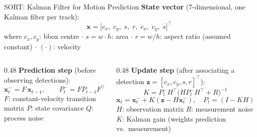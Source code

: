 \begin{frame}{SORT: Kalman Filter for Motion Prediction}
  \textbf{State vector} (7-dimensional, one Kalman filter per track):
  \[
    \mathbf{x} = \bigl[c_x,\; c_y,\; s,\; r,\; \dot{c}_x,\; \dot{c}_y,\; \dot{s}\bigr]^\top
  \]
  where $c_x, c_y$: bbox centre $\cdot$ $s = w \cdot h$: area $\cdot$
  $r = w/h$: aspect ratio (assumed constant) $\cdot$ $\dot{(\cdot)}$: velocity

  \begin{columns}[T]
    \begin{column}{0.48\textwidth}
      \textbf{Prediction step} (before observing detections):
      \[
        \mathbf{x}^-_t = F\,\mathbf{x}_{t-1}, \qquad
        P^-_t = F P_{t-1} F^\top + Q
      \]
      $F$: constant-velocity transition matrix \quad
      $P$: state covariance \quad $Q$: process noise
    \end{column}
    \begin{column}{0.48\textwidth}
      \textbf{Update step} (after associating a detection $\mathbf{z}=[c_x,c_y,s,r]^\top$):
      \[
        K = P^-_t H^\top\!\bigl(H P^-_t H^\top + R\bigr)^{-1}
      \]
      \[
        \mathbf{x}_t = \mathbf{x}^-_t + K\!\left(\mathbf{z} - H\mathbf{x}^-_t\right),
        \quad P_t = (I - KH)\,P^-_t
      \]
      $H$: observation matrix \quad $R$: measurement noise \quad
      $K$: Kalman gain (weights prediction vs.\ measurement)
    \end{column}
  \end{columns}
  \vspace{0.2em}
\end{frame}

